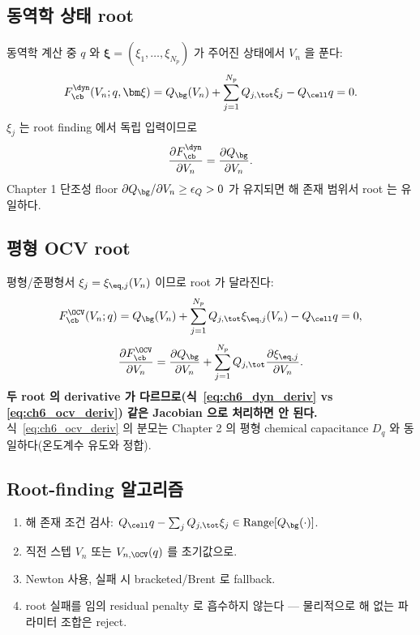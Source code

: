 \subsection{동역학 상태 root}
동역학 계산 중 $q$ 와 $\bm\xi=(\xi_1,\dots,\xi_{N_p})$ 가 주어진 상태에서 $V_n$ 을 푼다:
\begin{equation}
F_{\cb}^{\dyn}(V_n;q,\bm\xi)=Q_\bg(V_n)+\sum_{j=1}^{N_p}Q_{j,\tot}\xi_j-Q_\cell q=0.
\label{eq:ch6_dyn_root}
\end{equation}
$\xi_j$ 는 root finding 에서 독립 입력이므로
\begin{equation}
\frac{\partial F_{\cb}^{\dyn}}{\partial V_n}=\frac{\partial Q_\bg}{\partial V_n}.
\label{eq:ch6_dyn_deriv}
\end{equation}
Chapter 1 단조성 floor $\partial Q_\bg/\partial V_n\ge\epsilon_Q>0$ 가 유지되면 해 존재 범위서 root 는 유일하다.

\subsection{평형 OCV root}
평형/준평형서 $\xi_j=\xi_{\eq,j}(V_n)$ 이므로 root 가 달라진다:
\begin{equation}
F_{\cb}^{\OCV}(V_n;q)=Q_\bg(V_n)+\sum_{j=1}^{N_p}Q_{j,\tot}\xi_{\eq,j}(V_n)-Q_\cell q=0,
\label{eq:ch6_ocv_root}
\end{equation}
\begin{equation}
\frac{\partial F_{\cb}^{\OCV}}{\partial V_n}=\frac{\partial Q_\bg}{\partial V_n}+\sum_{j=1}^{N_p}Q_{j,\tot}\frac{\partial\xi_{\eq,j}}{\partial V_n}.
\label{eq:ch6_ocv_deriv}
\end{equation}
\textbf{두 root 의 derivative 가 다르므로(식~\eqref{eq:ch6_dyn_deriv} vs \eqref{eq:ch6_ocv_deriv}) 같은
Jacobian 으로 처리하면 안 된다.} 식~\eqref{eq:ch6_ocv_deriv} 의 분모는 Chapter 2 의 평형 chemical
capacitance $D_q$ 와 동일하다(온도계수 유도와 정합).

\subsection{Root-finding 알고리즘}
\begin{enumerate}[label=R\arabic*),leftmargin=2.2em]
\item 해 존재 조건 검사: $Q_\cell q-\sum_jQ_{j,\tot}\xi_j\in\mathrm{Range}[Q_\bg(\cdot)]$.
\item 직전 스텝 $V_n$ 또는 $V_{n,\OCV}(q)$ 를 초기값으로.
\item Newton 사용, 실패 시 bracketed/Brent 로 fallback.
\item root 실패를 임의 residual penalty 로 흡수하지 않는다 — 물리적으로 해 없는 파라미터 조합은 reject.
\end{enumerate}

